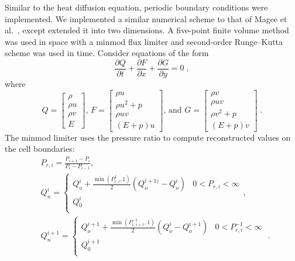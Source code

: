 \documentclass[mca,article,submit,moreauthors,pdftex]{Definitions/mdpi}
\begin{document}
\begin{paracol}{2}
Similar to the heat diffusion equation, periodic boundary conditions were implemented. 
We implemented a similar numerical scheme to that of Magee et al.~\cite{magee_accelerating_2018}, except extended it into two dimensions. 
A five-point finite volume method was used in space with a minmod flux limiter and second-order Runge--Kutta scheme was used in time. 
Consider equations of the form
\begin{equation*}
    \frac{\partial Q}{\partial t}+\frac{\partial F}{\partial x}+\frac{\partial G}{\partial y} = 0 \;,
\end{equation*}
where
\begin{equation*}
    Q = \begin{bmatrix}
        \rho\\
        \rho u\\
        \rho v\\
        E
        \end{bmatrix}
        \text{, }
    F = \begin{bmatrix}
    \rho u\\
    \rho u^2+p\\
    \rho u v\\
    (E+p)u
    \end{bmatrix}
    \text{, and }
    G = \begin{bmatrix}
    \rho v\\
    \rho u v\\
    \rho v^2+p\\
    (E+p)v
    \end{bmatrix} \;.
\end{equation*}
The minmod limiter uses the pressure ratio to compute reconstructed values on the cell boundaries:
\begin{align*}
   & P_{r,i} = \frac{P_{i+1}-P_{i}}{P_{i}-P_{i-1}},\\
    &Q_n^{i} = \begin{cases} 
      Q_o^{i}+\frac{\min(P_{r,i}^1,1)}{2}(Q_o^{i+1)}-Q_o^{i}) & 0 < P_{r,i} < \infty \\
      Q_0^{i} \\
   \end{cases},\\
    &Q_n^{i+1} = \begin{cases} 
      Q_o^{i+1}+\frac{\min(P_{r,i+1}^{-1},1)}{2}(Q_o^{i}-Q_o^{i+1}) & 0 < P_{r,i}^{-1} < \infty \\
      Q_0^{i+1} \\
   \end{cases} \;.

\end{align*}
\end{paracol}
\end{document}
